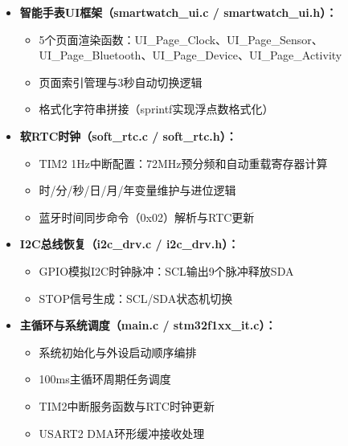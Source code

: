 \begin{itemize}
\begin{itemize}
        \item 一阶低通滤波（指数加权平均）：平滑加速度数据
        \item 动态阈值检测：滑动窗口内维护最大值/最小值
        \item 200ms最小步间间隔防抖：时间戳比较实现
        \item 距离与卡路里估算：基于步数乘以平均步长/单步卡路里
    \end{itemize}
    \item \textbf{智能手表UI框架（smartwatch\_ui.c / smartwatch\_ui.h）：}
    \begin{itemize}
        \item 5个页面渲染函数：UI\_Page\_Clock、UI\_Page\_Sensor、UI\_Page\_Bluetooth、UI\_Page\_Device、UI\_Page\_Activity
        \item 页面索引管理与3秒自动切换逻辑
        \item 格式化字符串拼接（sprintf实现浮点数格式化）
    \end{itemize}
    \item \textbf{软RTC时钟（soft\_rtc.c / soft\_rtc.h）：}
    \begin{itemize}
        \item TIM2 1Hz中断配置：72MHz预分频和自动重载寄存器计算
        \item 时/分/秒/日/月/年变量维护与进位逻辑
        \item 蓝牙时间同步命令（0x02）解析与RTC更新
    \end{itemize}
    \item \textbf{I2C总线恢复（i2c\_drv.c / i2c\_drv.h）：}
    \begin{itemize}
        \item GPIO模拟I2C时钟脉冲：SCL输出9个脉冲释放SDA
        \item STOP信号生成：SCL/SDA状态机切换
    \end{itemize}
    \item \textbf{主循环与系统调度（main.c / stm32f1xx\_it.c）：}
    \begin{itemize}
        \item 系统初始化与外设启动顺序编排
        \item 100ms主循环周期任务调度
        \item TIM2中断服务函数与RTC时钟更新
        \item USART2 DMA环形缓冲接收处理
    \end{itemize}
\end{itemize}

